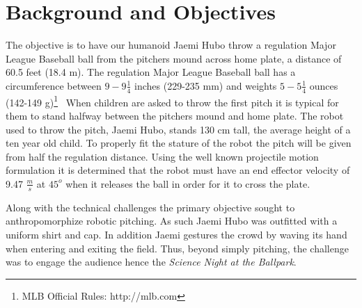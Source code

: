 \section{\bf Background and Objectives}\label{sec:background}

The objective is to have our humanoid Jaemi Hubo throw a regulation Major League Baseball ball from the pitchers mound across home plate, a distance of 60.5 feet (18.4 m).  
The regulation Major League Baseball ball has a circumference between $9 - 9\frac{1}{4}$ inches (229-235 mm) and weights $5-5\frac{1}{4}$ ounces (142-149 g)\footnote{MLB Official Rules: http://mlb.com}~%
When children are asked to throw the first pitch it is typical for them to stand halfway between the pitchers mound and home plate.
The robot used to throw the pitch, Jaemi Hubo, stands 130 cm tall, the average height of a ten year old child.
To properly fit the stature of the robot the pitch will be given from half the regulation distance.
Using the well known projectile motion formulation it is determined that the robot must have an end effector velocity of 9.47 $\frac{m}{s}$ at $45^o$ when it releases the ball in order for it to cross the plate.

Along with the technical challenges the primary objective sought to anthropomorphize robotic pitching.  
As such Jaemi Hubo was outfitted with a uniform shirt and cap.
In addition Jaemi gestures the crowd by waving its hand when entering and exiting the field.
Thus, beyond simply pitching, the challenge was to engage the audience hence the \textit{Science Night at the Ballpark}.





